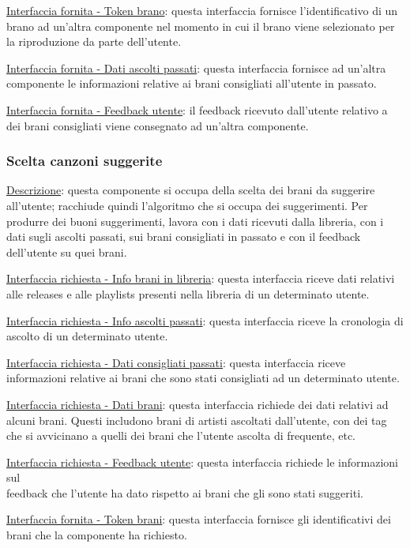 \documentclass[a4paper,12pt]{article}
\begin{document}
\underline{Interfaccia fornita - Token brano}: questa interfaccia fornisce l’identificativo di un brano ad un’altra componente nel momento in cui il brano viene selezionato per la riproduzione da parte dell’utente.

\underline{Interfaccia fornita - Dati ascolti passati}: questa interfaccia fornisce ad un’altra componente le informazioni relative ai brani consigliati all’utente in passato.

\underline{Interfaccia fornita - Feedback utente}: il feedback ricevuto dall’utente relativo a dei brani consigliati viene consegnato ad un’altra componente.

\subsubsection{Scelta canzoni suggerite}

\underline{Descrizione}: questa componente si occupa della scelta dei brani da suggerire all’utente; racchiude quindi l’algoritmo che si occupa dei suggerimenti. Per produrre dei buoni suggerimenti, lavora con i dati ricevuti dalla libreria, con i dati sugli ascolti passati, sui brani consigliati in passato e con il feedback dell’utente su quei brani.

\underline{Interfaccia richiesta - Info brani in libreria}: questa interfaccia riceve dati relativi alle releases e alle playlists presenti nella libreria di un determinato utente.

\underline{Interfaccia richiesta - Info ascolti passati}: questa interfaccia riceve la cronologia di ascolto di un determinato utente.

\underline{Interfaccia richiesta - Dati consigliati passati}: questa interfaccia riceve informazioni relative ai brani che sono stati consigliati ad un determinato utente.

\underline{Interfaccia richiesta - Dati brani}: questa interfaccia richiede dei dati relativi ad alcuni brani. Questi includono brani di artisti ascoltati dall’utente, con dei tag che si avvicinano a quelli dei brani che l’utente ascolta di frequente, etc.

\underline{Interfaccia richiesta - Feedback utente}: questa interfaccia richiede le informazioni sul \\ feedback che l’utente ha dato rispetto ai brani che gli sono stati suggeriti.

\underline{Interfaccia fornita - Token brani}: questa interfaccia fornisce gli identificativi dei brani che la componente ha richiesto.
\end{document}

